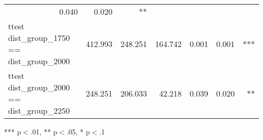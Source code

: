 \documentclass{article}
\begin{document}
\begin{table}[!h]
\begin{tabular}{lllllll}
  \multicolumn{1}{r}{0.040} &
  \multicolumn{1}{r}{0.020} &
  \multicolumn{1}{r}{**} \\
\multicolumn{1}{l}{ttest dist\_group\_1750 == dist\_group\_2000} &
  \multicolumn{1}{|r}{412.993} &
  \multicolumn{1}{r}{248.251} &
  \multicolumn{1}{r}{164.742} &
  \multicolumn{1}{r}{0.001} &
  \multicolumn{1}{r}{0.001} &
  \multicolumn{1}{r}{***} \\
\multicolumn{1}{l}{ttest dist\_group\_2000 == dist\_group\_2250} &
  \multicolumn{1}{|r}{248.251} &
  \multicolumn{1}{r}{206.033} &
  \multicolumn{1}{r}{42.218} &
  \multicolumn{1}{r}{0.039} &
  \multicolumn{1}{r}{0.020} &
  \multicolumn{1}{r}{**} \\
\cline{1-7}
\end{tabular}

\footnotesize{
*** p$<$.01, ** p$<$.05, * p$<$.1
}
\end{table}
\end{document}
